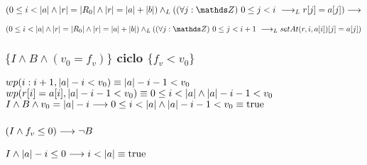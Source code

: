 \documentclass{article}
\begin{document}
$ (0 \leq i < \longitud{a} \wedge \longitud{r} = \longitud{R_{0}} \wedge \longitud{r} = \longitud{a} + \longitud{b}) \yLuego (\paraTodo{j}{0}{i} \implicaLuego r[j]=a[j]) \implica $

$ (0 \leq i < \longitud{a} \wedge \longitud{r} = \longitud{R_{0}} \wedge \longitud{r} = \longitud{a} + \longitud{b}) \yLuego (\paraTodo{j}{0}{i+1} \implicaLuego setAt(r,i,a[i])[j]=a[j]) $

\subsubsection*{$\{I \wedge B \wedge (v_{0} = f_{v})\}$ ciclo $\{f_{v} < v_{0}\}$}

$wp(i:i+1, |a|-i<v_{0}) \equiv |a|-i-1<v_{0}$\\

$wp(r[i] = a[i], |a|-i-1<v_{0}) \equiv 0 \leq i < |a| \wedge |a|-i-1<v_{0}$\\

$I \wedge B \wedge v_{0} = |a|-i \longrightarrow 0 \leq i < |a| \wedge |a|-i-1<v_{0} \equiv \mathrm{true}$

\subsubsection*{$(I \wedge f_{v} \leq 0) \longrightarrow \neg B$}

$I \wedge |a|-i \leq 0 \longrightarrow i < |a| \equiv \mathrm{true}$
\end{document}
